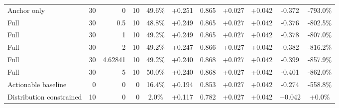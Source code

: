 \begin{table}[htbp]
\begin{tabular}{lrrrccccccc}
Anchor only & 30 & 0 & 10 & 49.6\% & +0.251 & 0.865 & +0.027 & +0.042 & -0.372 & -793.0\% \\
Full & 30 & 0.5 & 10 & 48.8\% & +0.249 & 0.865 & +0.027 & +0.042 & -0.376 & -802.5\% \\
Full & 30 & 1 & 10 & 49.2\% & +0.249 & 0.865 & +0.027 & +0.042 & -0.378 & -807.0\% \\
Full & 30 & 2 & 10 & 49.2\% & +0.247 & 0.866 & +0.027 & +0.042 & -0.382 & -816.2\% \\
Full & 30 & 4.62841 & 10 & 49.2\% & +0.240 & 0.868 & +0.027 & +0.042 & -0.399 & -857.9\% \\
Full & 30 & 5 & 10 & 50.0\% & +0.240 & 0.868 & +0.027 & +0.042 & -0.401 & -862.0\% \\
Actionable baseline & 0 & 0 & 0 & 16.4\% & +0.194 & 0.853 & +0.027 & +0.042 & -0.274 & -558.8\% \\
Distribution constrained & 10 & 0 & 0 & 2.0\% & +0.117 & 0.782 & +0.027 & +0.042 & +0.042 & +0.0\% \\
\bottomrule
\end{tabular}
\end{table}